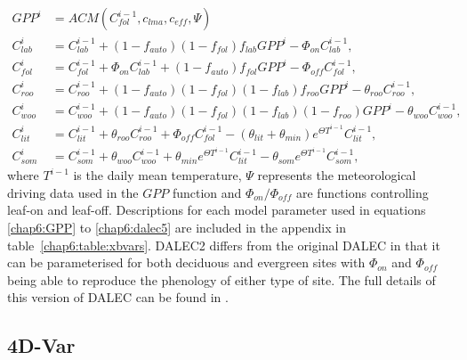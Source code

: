 \begin{align}
GPP^{i} &= ACM(C_{fol}^{i-1}, c_{lma}, c_{eff}, \Psi) \label{chap6:GPP}
\\C_{lab}^{i}&=C_{lab}^{i-1}+(1-f_{auto})(1-f_{fol})f_{lab}GPP^{i}-\Phi _{on}C_{lab}^{i-1}, \label{chap6:daleclab}
\\C_{fol}^{i}&=C_{fol}^{i-1}+\Phi_{on}C_{lab}^{i-1}+(1-f_{auto})f_{fol}GPP^{i}-\Phi_{off}C_{fol}^{i-1}, \label{chap6:dalec1}
\\C_{roo}^{i}&=C_{roo}^{i-1}+(1-f_{auto})(1-f_{fol})(1-f_{lab})f_{roo}GPP^{i}-\theta_{roo}C_{roo}^{i-1}, 
\\C_{woo}^{i}&=C_{woo}^{i-1}+(1-f_{auto})(1-f_{fol})(1-f_{lab})(1-f_{roo})GPP^{i}-\theta_{woo}C_{woo}^{i-1}, 
\\C_{lit}^{i}&=C_{lit}^{i-1}+\theta_{roo}C_{roo}^{i-1}+\Phi_{off}C_{fol}^{i-1}-(\theta_{lit}+\theta_{min})e^{\Theta T^{i-1}}C_{lit}^{i-1}, 
\\C_{som}^{i}&=C_{som}^{i-1}+\theta_{woo}C_{woo}^{i-1}+\theta_{min}e^{\Theta T^{i-1}}C_{lit}^{i-1}-\theta_{som}e^{\Theta T^{i-1}}C_{som}^{i-1}, \label{chap6:dalec5}
\end{align}
where $T^{i-1}$ is the daily mean temperature, $\Psi$ represents the meteorological driving data used in the $GPP$ function and $\Phi_{on} / \Phi_{off}$ are functions controlling leaf-on and leaf-off. Descriptions for each model parameter used in equations \eqref{chap6:GPP} to \eqref{chap6:dalec5} are included in the appendix in table~\ref{chap6:table:xbvars}. DALEC2 differs from the original DALEC in that it can be parameterised for both deciduous and evergreen sites with $\Phi_{on}$ and $\Phi_{off}$ being able to reproduce the phenology of either type of site. The full details of this version of DALEC can be found in \cite{Bloom2015}. 

\subsection{4D-Var} \label{chap6:4dvar}


